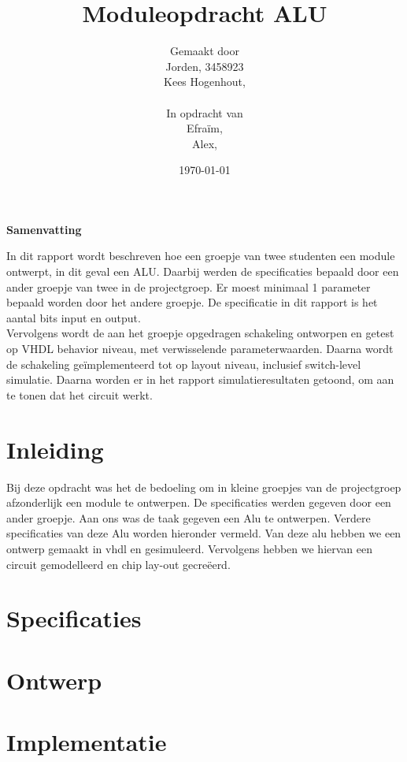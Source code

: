 \documentclass[11pt,twoside,a4paper]{article}
\title{Moduleopdracht ALU}
\author{
Gemaakt door\\
Jorden, 3458923\\
Kees Hogenhout, \\
\\
In opdracht van \\
Efraïm, \\
Alex, \\
}
\date{\today}
\begin{document}
\maketitle
\thispagestyle{empty}
\vspace{30 mm}
\begin{center}
\Large \bf 
Samenvatting
\end{center}
In dit rapport wordt beschreven hoe een groepje van twee studenten een module ontwerpt, in dit geval een ALU. Daarbij werden de specificaties bepaald door een ander groepje van twee in de projectgroep. Er moest minimaal 1 parameter bepaald worden door het andere groepje. De specificatie in dit rapport is het aantal bits input en output.
 \\
Vervolgens  wordt de aan het groepje opgedragen schakeling ontworpen en getest op VHDL behavior niveau, met verwisselende parameterwaarden. Daarna wordt de schakeling geïmplementeerd tot op layout niveau, inclusief switch-level simulatie. 
Daarna worden er in het rapport simulatieresultaten getoond, om aan te tonen dat het circuit werkt. 
\clearpage

\tableofcontents
\clearpage

\section{Inleiding}
Bij deze opdracht was het de bedoeling om in kleine groepjes van de projectgroep afzonderlijk een module te ontwerpen. De specificaties werden gegeven door een ander groepje. Aan ons was de taak gegeven een Alu te ontwerpen. Verdere specificaties van deze Alu worden hieronder vermeld. Van deze  alu hebben we een ontwerp gemaakt in vhdl en gesimuleerd. Vervolgens hebben we hiervan een circuit gemodelleerd en chip lay-out gecreëerd. 

\section{Specificaties}
\scriptsize

\normalsize

\section{Ontwerp}


\section{Implementatie}

\end{document}
